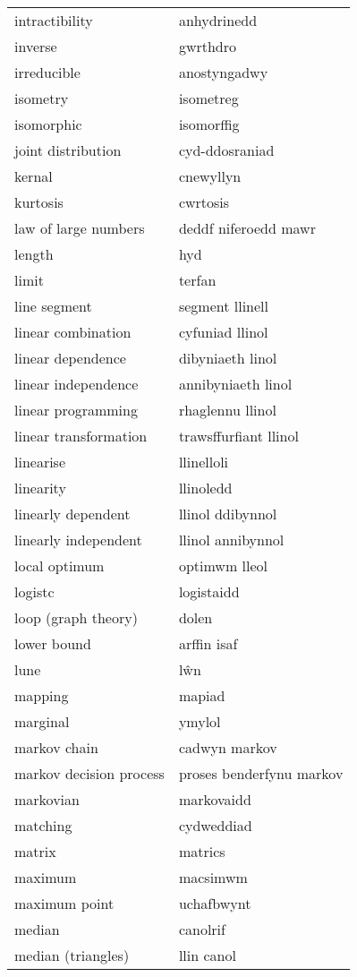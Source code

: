 \begin{supertabular}{p{0.22\textwidth}p{0.22\textwidth}}
intractibility & anhydrinedd \\
inverse & gwrthdro \\
irreducible & anostyngadwy \\
isometry & isometreg \\
isomorphic & isomorffig \\
joint distribution & cyd-ddosraniad \\
kernal & cnewyllyn \\
kurtosis & cwrtosis \\
law of large numbers & deddf niferoedd mawr \\
length & hyd \\
limit & terfan \\
line segment & segment llinell \\
linear combination & cyfuniad llinol \\
linear dependence & dibyniaeth linol \\
linear independence & annibyniaeth linol \\
linear programming & rhaglennu llinol \\
linear transformation & trawsffurfiant llinol \\
linearise & llinelloli \\
linearity & llinoledd \\
linearly dependent & llinol ddibynnol \\
linearly independent & llinol annibynnol \\
local optimum & optimwm lleol \\
logistc & logistaidd \\
loop (graph theory) & dolen \\
lower bound & arffin isaf \\
lune & lŵn \\
mapping & mapiad \\
marginal & ymylol \\
markov chain & cadwyn markov \\
markov decision process & proses benderfynu markov \\
markovian & markovaidd \\
matching & cydweddiad \\
matrix & matrics \\
maximum & macsimwm \\
maximum point & uchafbwynt \\
median & canolrif \\
median (triangles) & llin canol \\

\end{supertabular}
